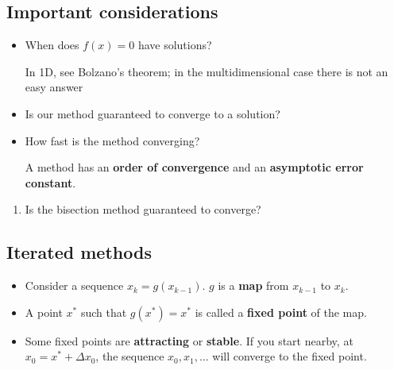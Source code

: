 \documentclass[12pt,letterpaper,noanswers]{exam}
\begin{document}
\subsection*{Important considerations}
\begin{tcolorbox}
\begin{itemize}
\itemsep0pt
    \item When does $f(x) = 0$ have solutions?
    
    In 1D, see Bolzano's theorem; in the multidimensional case there is not an easy answer
    \item Is our method guaranteed to converge to a solution?
    \item How fast is the method converging?
    
    A method has an \textbf{order of convergence} and an \textbf{asymptotic error constant}.
    
\end{itemize}
\end{tcolorbox}



\begin{enumerate}[resume=classQ]
\itemsep0pt
    \item Is the bisection method guaranteed to converge?  
\end{enumerate}

\subsection*{Iterated methods}

\begin{tcolorbox}
\begin{itemize}
\itemsep0pt
    \item Consider a sequence $x_k = g(x_{k-1})$.  $g$ is a \textbf{map} from $x_{k-1}$ to $x_k$.  
    \item A point $x^*$ such that $g(x^*) = x^*$ is called a \textbf{fixed point} of the map.
    \item Some fixed points are \textbf{attracting} or \textbf{stable}.  If you start nearby, at $x_0 = x^* + \Delta x_0$, the sequence $x_0, x_1, ...$ will converge to the fixed point.
\end{itemize}
\end{tcolorbox}
\end{document}

